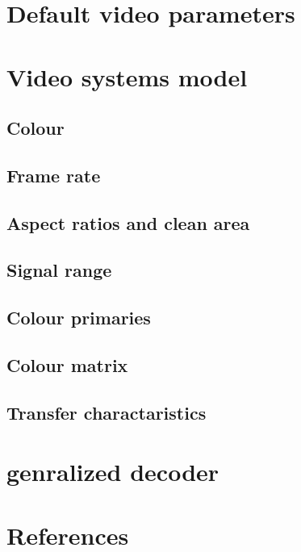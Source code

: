 \section{Default video parameters}

\clearpage
\section{Video systems model}
\subsection{Colour}
\subsection{Frame rate}
\subsection{Aspect ratios and clean area}
\subsection{Signal range}
\subsection{Colour primaries}
\subsection{Colour matrix}
\subsection{Transfer charactaristics}

\clearpage
\section{genralized decoder}

\clearpage
\section{References}
